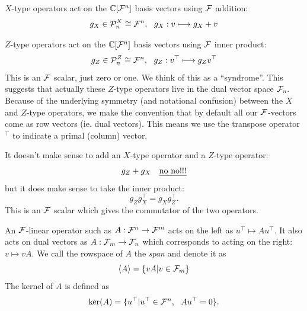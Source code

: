 $X$-type operators act on the $\mathbb{C}[\mathcal{F}^n]$
basis vectors using $\mathcal{F}$ addition:
$$
    g_X \in \mathcal{P}^X_n \cong \mathcal{F}^n, \ \ g_X : v \longmapsto g_X + v
$$

$Z$-type operators act on the
$\mathbb{C}[\mathcal{F}^n]$ basis vectors using $\mathcal{F}$ inner product:
$$
    g_Z \in \Pauli^Z_n \cong \Fn, \ \ g_Z : v^\top \longmapsto g_Z v^\top
$$
This is an $\mathcal{F}$ scalar, just zero or one. We think of this
as a ``syndrome''.
This suggests that actually these $Z$-type operators
live in the dual vector space $\mathcal{F}_{n}.$
Because of the underlying symmetry
(and notational confusion)
between the $X$ and $Z$-type operators,
we make the convention that by default
all our $\mathcal{F}$-vectors come as row vectors (ie. dual vectors).
This means we use the transpose operator $^\top$ to
indicate a primal (column) vector.

It doesn't make sense to add an $X$-type operator and
a $Z$-type operator:
$$
    g_Z + g_X \ \ \ \mbox{\emph{no no!!!}}
$$
but it does make sense to take the inner product:
$$
    g_Z g_X^\top = g_X g_Z^\top.
$$
This is an $\mathcal{F}$ scalar which gives the commutator of the 
two operators.

An $\mathcal{F}$-linear operator such as
$ A : \mathcal{F}^n \to \mathcal{F}^m $
acts on the left as $ u^\top \mapsto A u^\top.$
It also acts on dual vectors as
$ A : \mathcal{F}_{m} \to \mathcal{F}_{n} $
which corresponds to acting on the right: $v \mapsto vA.$ 
We call the rowspace of 
$A$ the \emph{span} and denote 
it as 
$$\langle A \rangle = \{ vA | v \in \mathcal{F}_{m} \}$$
The kernel of $A$ is defined as
$$
    \mathrm{ker}(A) = \{ u^\top | u^\top \in \mathcal{F}^n,\ \  A u^\top = 0 \}.
$$

